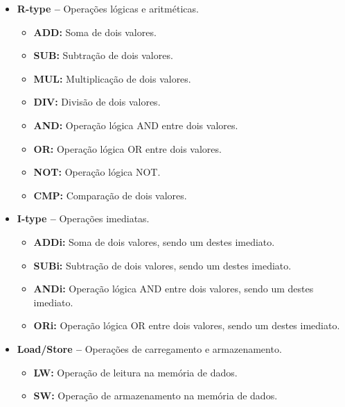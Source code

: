 \documentclass{report}
\begin{document}
  \begin{itemize}
    \item \textbf{R-type --} Operações lógicas e aritméticas.\\
    \begin{itemize}
        \item \textbf{ADD:} Soma de dois valores.
        \item \textbf{SUB:} Subtração de dois valores.
        \item \textbf{MUL:} Multiplicação de dois valores.
        \item \textbf{DIV:} Divisão de dois valores.
        \item \textbf{AND:} Operação lógica AND entre dois valores.
        \item \textbf{OR:} Operação lógica OR entre dois valores.
        \item \textbf{NOT:} Operação lógica NOT.
        \item \textbf{CMP:} Comparação de dois valores.
    \end{itemize}

    \item \textbf{I-type --} Operações imediatas.\\ 
    \begin{itemize}
        \item \textbf{ADDi:} Soma de dois valores, sendo um destes imediato.
        \item \textbf{SUBi:} Subtração de dois valores, sendo um destes imediato.
        \item \textbf{ANDi:} Operação lógica AND entre dois valores, sendo um destes imediato.
        \item \textbf{ORi:} Operação lógica OR entre dois valores, sendo um destes imediato.     
    \end{itemize}

    
    \item \textbf{Load/Store --} Operações de carregamento e armazenamento.\\
    \begin{itemize}
        \item \textbf{LW:} Operação de leitura na memória de dados.
        \item \textbf{SW:} Operação de armazenamento na memória de dados.
    \end{itemize}
    

\end{itemize}
\end{document}
